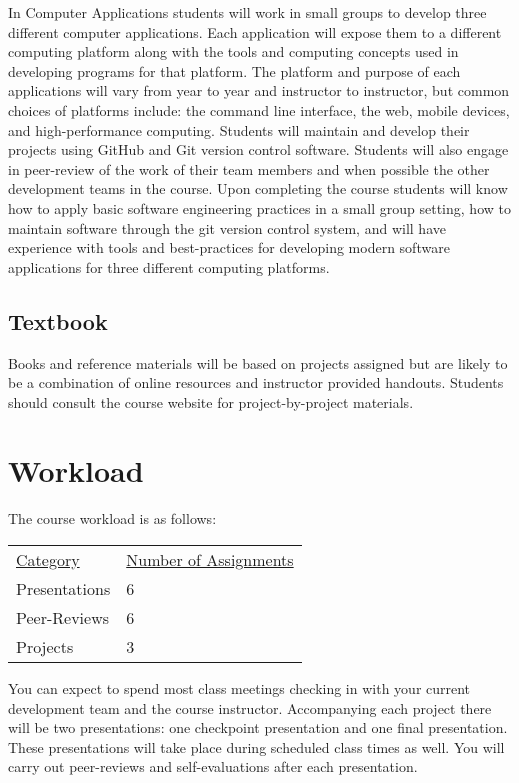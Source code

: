 \documentclass[10pt]{article}
\begin{document}
In Computer Applications students will work in small groups to develop three different computer applications.  Each application will expose them to a different computing platform along with the tools and computing concepts used in developing programs for that platform. The platform and purpose of each applications will vary from year to year and instructor to instructor, but common choices of platforms include: the command line interface, the web, mobile devices, and high-performance computing. Students will maintain and develop their projects using GitHub and Git version control software. Students will also engage in peer-review of the work of their team members and when possible the other development teams in the course. Upon completing the course students will know how to apply basic software engineering practices in a small group setting, how to maintain software through the git version control system, and will have experience with tools and best-practices for developing modern software applications for three different computing platforms.

\subsection{Textbook}

Books and reference materials will be based on projects assigned but are likely to be a combination of online resources and instructor provided handouts.  Students should consult the course website for project-by-project materials.

\section{Workload}

The course workload is as follows:
\begin{center}
  \begin{tabular}{ll}
    \underline{Category} & \underline{Number of Assignments} \\
    Presentations & 6 \\
    Peer-Reviews & 6 \\
    Projects & 3 \\
  \end{tabular}
\end{center}

You can expect to spend most class meetings checking in with your current development team and the course instructor. Accompanying each project there will be two presentations: one checkpoint presentation and one final presentation. These presentations will take place during scheduled class times as well. You will carry out peer-reviews and self-evaluations after each presentation.
\end{document}
